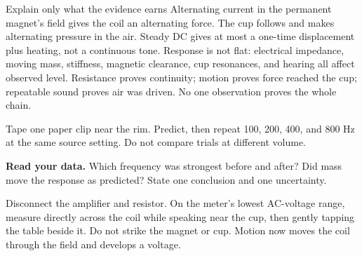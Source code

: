 \begin{telospanel}{Explain only what the evidence earns}
Alternating current in the permanent magnet's field gives the coil an
alternating force. The cup follows and makes alternating pressure in the air.
Steady DC gives at most a one-time displacement plus heating, not a continuous
tone. Response is not flat: electrical impedance, moving mass, stiffness,
magnetic clearance, cup resonances, and hearing all affect observed level.
Resistance proves continuity; motion proves force reached the cup; repeatable
sound proves air was driven. No one observation proves the whole chain.
\end{telospanel}

Tape one paper clip near the rim. Predict, then repeat 100, 200, 400, and
800 Hz at the same source setting. Do not compare trials at different volume.
\begin{center}
\end{center}
\smallskip
\textbf{Read your data.} Which frequency was strongest before and after? Did
mass move the response as predicted? State one conclusion and one uncertainty.

Disconnect the amplifier and resistor. On the meter's lowest AC-voltage range,
measure directly across the coil while speaking near the cup, then gently
tapping the table beside it. Do not strike the magnet or cup. Motion now moves
the coil through the field and develops a voltage.

